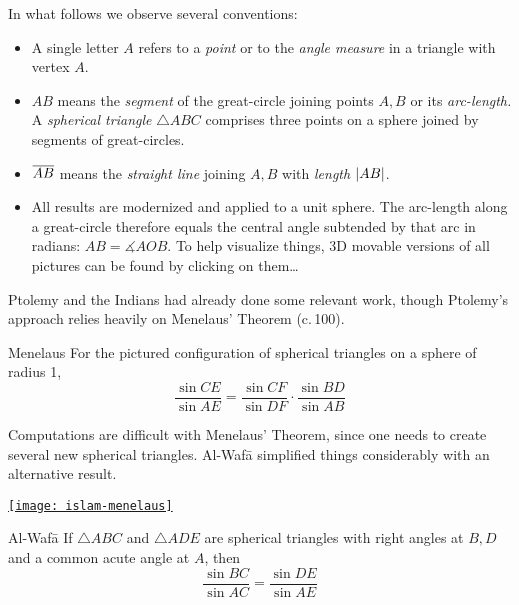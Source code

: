 
In what follows we observe several conventions:
\begin{itemize}\itemsep0pt
  \item A single letter $A$ refers to a \emph{point} or to the \emph{angle measure} in a triangle with vertex $A$.
  \item $AB$ means the \emph{segment} of the great-circle joining points $A,B$ or its \emph{arc-length.} A \emph{spherical triangle} $\triangle ABC$ comprises three points on a sphere joined by segments of great-circles.
  \item $\overline{AB}$ means the \emph{straight line} joining $A,B$ with \emph{length} $\left| AB\right|$.
  \item All results are modernized and applied to a unit sphere. The arc-length along a great-circle therefore equals the central angle subtended by that arc in radians: $AB=\measuredangle AOB$. To help visualize things, 3D movable versions of all pictures can be found by clicking on them\ldots 
\end{itemize}

\begin{minipage}[t]{0.75\linewidth}\vspace{-5pt}
	Ptolemy and the Indians had already done some relevant work, though Ptolemy's approach relies heavily on Menelaus' Theorem (c.\,100\AD).
	
	\begin{thm*}{Menelaus}{}
	For the pictured configuration of spherical triangles on a sphere of radius 1,
	\[
		\frac{\sin CE}{\sin AE}=\frac{\sin CF}{\sin DF}\cdot\frac{\sin BD}{\sin AB}
	\]
	\end{thm*}
	
	Computations are difficult with Menelaus' Theorem, since one needs to create several new spherical triangles. Al-Wafā simplified things considerably with an alternative result.
	\end{minipage}
	\hfill
	\begin{minipage}[t]{0.24\linewidth}\vspace{-5pt}
		\flushright
		\href{http://math.uci.edu/~ndonalds/math184/islam-menelaus.html}{\texttt{[image: islam-menelaus]}}
\end{minipage}
\medbreak




\begin{thm*}{Al-Wafā}{}
	If $\triangle ABC$ and $\triangle ADE$ are spherical triangles with right angles at $B,D$ and a common acute angle at $A$, then
	\[
		\frac{\sin BC}{\sin AC}=\frac{\sin DE}{\sin AE}
	\]
\end{thm*}

